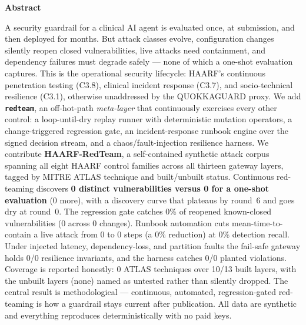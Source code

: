 \documentclass[11pt]{article}
\providecommand{\EoneOneShot}{0}
\providecommand{\EoneContinuous}{0}
\providecommand{\EoneExtra}{0}
\providecommand{\EoneRoundsToDry}{0}
\providecommand{\EtwoCatch}{0\%}
\providecommand{\EtwoReopened}{0}
\providecommand{\EtwoChanges}{0}
\providecommand{\EthreeMttcRed}{0\%}
\providecommand{\EthreeAutoMttc}{0}
\providecommand{\EthreeManMttc}{0}
\providecommand{\EthreeRecall}{0\%}
\providecommand{\EfourProdHeld}{0}
\providecommand{\EfourProdTotal}{0}
\providecommand{\EfourValCaught}{0}
\providecommand{\EfourValTotal}{0}
\providecommand{\EfiveAtlas}{0}
\providecommand{\EfiveNotTested}{none}
\providecommand{\EfiveBuilt}{10}
\providecommand{\EfiveTotal}{13}
\begin{document}
\vspace{0.5em}
\begin{tcolorbox}[breakable, enhanced jigsaw, colback=black!4, colframe=black!4,
  arc=5pt, boxrule=0pt, left=16pt, right=16pt, top=10pt, bottom=10pt]
\setlength{\parskip}{0pt}
{\centering\large\bfseries Abstract\par}
\smallskip
\fontsize{9.5}{11.3}\selectfont
A security guardrail for a clinical AI agent is evaluated once, at submission, and
then deployed for months. But attack classes evolve, configuration changes silently
reopen closed vulnerabilities, live attacks need containment, and dependency
failures must degrade safely --- none of which a one-shot evaluation captures. This
is the operational security lifecycle: HAARF's continuous penetration testing
(C3.8), clinical incident response (C3.7), and socio-technical resilience (C3.1),
otherwise unaddressed by the QUOKKAGUARD proxy. We add \textbf{\texttt{redteam}}, an
off-hot-path \emph{meta-layer} that continuously exercises every other control: a
loop-until-dry replay runner with deterministic mutation operators, a
change-triggered regression gate, an incident-response runbook engine over the
signed decision stream, and a chaos/fault-injection resilience harness. We
contribute \textbf{HAARF-RedTeam}, a self-contained synthetic attack corpus spanning
all eight HAARF control families across all thirteen gateway layers, tagged by MITRE
ATLAS technique and built/unbuilt status. Continuous red-teaming discovers
\textbf{\EoneContinuous{} distinct vulnerabilities versus \EoneOneShot{} for a
one-shot evaluation} (\EoneExtra{} more), with a discovery curve that plateaus by
round~6 and goes dry at round~\EoneRoundsToDry. The regression gate catches
\EtwoCatch{} of reopened known-closed vulnerabilities (\EtwoReopened{} across
\EtwoChanges{} changes). Runbook automation cuts mean-time-to-contain a live attack
from \EthreeManMttc{} to \EthreeAutoMttc{} steps (a \EthreeMttcRed{} reduction) at
\EthreeRecall{} detection recall. Under injected latency, dependency-loss, and
partition faults the fail-safe gateway holds \EfourProdHeld/\EfourProdTotal{}
resilience invariants, and the harness catches \EfourValCaught/\EfourValTotal{}
planted violations. Coverage is reported honestly: \EfiveAtlas{} ATLAS techniques
over \EfiveBuilt/\EfiveTotal{} built layers, with the unbuilt layers
(\EfiveNotTested) named as untested rather than silently dropped. The central
result is methodological --- continuous, automated, regression-gated red-teaming is
how a guardrail stays current after publication. All data are synthetic and
everything reproduces deterministically with no paid keys.


\end{tcolorbox}
\end{document}

